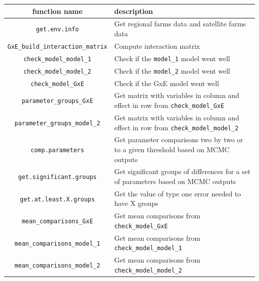 \documentclass{book}\usepackage[]{graphicx}\usepackage[]{color}
\begin{document}
\begin{table}[H]
\begin{tabular}{cp{}}

\hline
\textbf{function name} & \textbf{description} \\ \hline

\texttt{get.env.info} & Get regional farms data and satellite farms data \\ \hline

\texttt{GxE\_build\_interaction\_matrix} & Compute interaction matrix \\ \hline

\texttt{check\_model\_model\_1} & Check if the \texttt{model\_1} model went well  \\ \hline

\texttt{check\_model\_model\_2} & Check if the \texttt{model\_2} model went well \\ \hline

\texttt{check\_model\_GxE} & Check if the GxE model went well \\ \hline

\texttt{parameter\_groups\_GxE} & Get matrix with variables in column and effect in row from \texttt{check\_model\_GxE} \\ \hline

\texttt{parameter\_groups\_model\_2} & Get matrix with variables in column and effect in row from \texttt{check\_model\_model\_2} \\ \hline

\texttt{comp.parameters} & Get parameter comparisons two by two or to a given threshold based on MCMC outputs \\ \hline

\texttt{get.significant.groups} & Get significant groups of differences for a set of parameters based on MCMC outputs \\ \hline

\texttt{get.at.least.X.groups} & Get the value of type one error needed to have X groups \\ \hline

\texttt{mean\_comparisons\_GxE} & Get mean comparisons from \texttt{check\_model\_GxE} \\ \hline

\texttt{mean\_comparisons\_model\_1} & Get mean comparisons from \texttt{check\_model\_model\_1} \\ \hline

\texttt{mean\_comparisons\_model\_2} &Get mean comparisons from \texttt{check\_model\_model\_2}  \\ \hline


\end{tabular}
\end{table}
\end{document}
